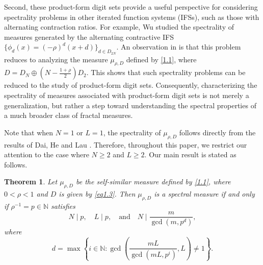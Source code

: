 \documentclass[11pt]{article}
\newtheorem{theorem}{Theorem}[section]
\numberwithin{equation}{section}
\begin{document}
	Second, these product-form digit sets provide a useful perspective for considering spectrality problems in other iterated function systems (IFSs), such as those with alternating contraction ratios. For example, Wu \cite{Wu2024} studied the spectrality of measures generated by the alternating contractive IFS $\{ \phi_d(x)=(-\rho)^d(x+d) \}_{d\in D_{2N}}$. An  observation in  \cite[Proposition~4.2]{Wu2024} is that this problem reduces to analyzing the measure $\mu_{\rho,D}$ defined by \eqref{1.1}, where
	$
	D = D_N \oplus \left( N - \frac{1+\rho}{2} \right) D_2 .
	$
	This shows that such spectrality problems can  be reduced to the study of product-form digit sets. 
	Consequently,  characterizing the spectrality of measures associated with product-form digit sets is not merely a  generalization, but rather a step toward understanding the spectral properties of a much broader class of fractal measures.


Note that when $N=1$ or $L=1$, the spectrality of $\mu_{\rho,D}$ follows directly from the results of Dai, He and Lau \cite{Dai-He-Lau_2014}. Therefore, throughout this paper,  we restrict our attention to the case where $N \ge 2$ and $L \ge 2$. Our main result is stated as follows.

\begin{theorem}\label{1.2}
	Let $\mu_{\rho,D}$ be the self-similar measure defined by \eqref{1.1}, where $0<\rho<1$ and $D$ is given by \eqref{eq1.3}. Then $\mu_{\rho,D}$ is a spectral measure if and only if $\rho^{-1}=p\in\mathbb{N}$ satisfies
	\[
	N\mid p,\quad L\mid p,\quad \text{and}\quad N\mid \frac{m}{\gcd(m,p^d)},
	\]	
	where
	\begin{equation}\label{2.11}
		d=\max\left\{i \in \mathbb{N} : \gcd\left(\frac{mL}{\gcd(mL,p^i)},L\right)\neq 1\right\}.
	\end{equation}
\end{theorem}
\end{document}

